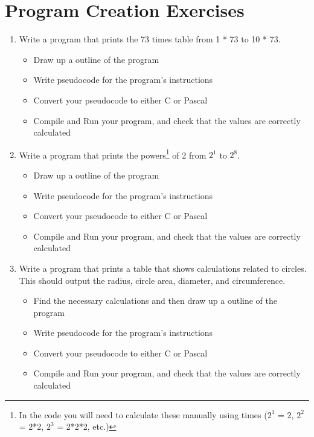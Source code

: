 


\clearpage
\section{Program Creation Exercises} %
\label{sec:program_creation_exercises}

\begin{enumerate}
  \item Write a program that prints the 73 times table from 1 * 73 to 10 * 73.
  \begin{itemize}
    \item Draw up a outline of the program
    \item Write pseudocode for the program's instructions
    \item Convert your pseudocode to either C or Pascal
    \item Compile and Run your program, and check that the values are correctly calculated
  \end{itemize}
  
  \item Write a program that prints the powers\footnote{In the code you will need to calculate these manually using times ($2^1$ = 2, $2^2$ = 2*2, $2^3$ = 2*2*2, etc.)} of 2 from $2^1$ to $2^8$.
  \begin{itemize}
    \item Draw up a outline of the program
    \item Write pseudocode for the program's instructions
    \item Convert your pseudocode to either C or Pascal
    \item Compile and Run your program, and check that the values are correctly calculated
  \end{itemize}
  
  
  \item Write a program that prints a table that shows calculations related to circles. This should output the  radius, circle area, diameter, and circumference.
  \begin{itemize}
    \item Find the necessary calculations and then draw up a outline of the program
    \item Write pseudocode for the program's instructions
    \item Convert your pseudocode to either C or Pascal
    \item Compile and Run your program, and check that the values are correctly calculated
  \end{itemize}
  

\end{enumerate}
